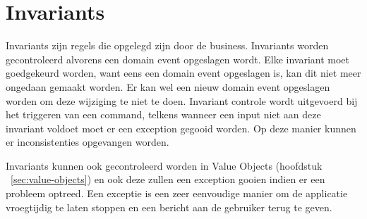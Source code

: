 
\section{Invariants}
\label{sec:invariants}

Invariants zijn regels die opgelegd zijn door de business. Invariants worden gecontroleerd alvorens een domain event opgeslagen wordt. Elke invariant moet goedgekeurd worden, want eens een domain event opgeslagen is, kan dit niet meer ongedaan gemaakt worden. Er kan wel een nieuw domain event opgeslagen worden om deze wijziging te niet te doen. Invariant controle wordt uitgevoerd bij het triggeren van een command, telkens wanneer een input niet aan deze invariant voldoet moet er een exception gegooid worden. Op deze manier kunnen er inconsistenties opgevangen worden.

Invariants kunnen ook gecontroleerd worden in Value Objects (hoofdstuk ~\ref{sec:value-objects}) en ook deze zullen een exception gooien indien er een probleem optreed.
Een exceptie is een zeer eenvoudige manier om de applicatie vroegtijdig te laten stoppen en een bericht aan de gebruiker terug te geven.
